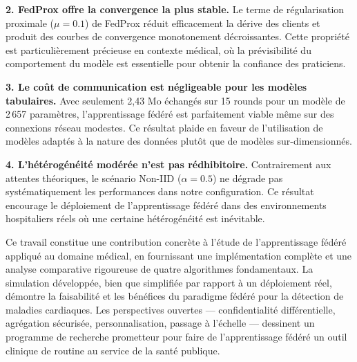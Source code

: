\documentclass[12pt,a4paper]{report}
\begin{document}
\textbf{2. FedProx offre la convergence la plus stable.} Le terme de r\'{e}gularisation proximale ($\mu = 0.1$) de FedProx r\'{e}duit efficacement la d\'{e}rive des clients et produit des courbes de convergence monotonement d\'{e}croissantes. Cette propri\'{e}t\'{e} est particuli\`{e}rement pr\'{e}cieuse en contexte m\'{e}dical, o\`{u} la pr\'{e}visibilit\'{e} du comportement du mod\`{e}le est essentielle pour obtenir la confiance des praticiens.

\textbf{3. Le co\^{u}t de communication est n\'{e}gligeable pour les mod\`{e}les tabulaires.} Avec seulement 2,43 Mo \'{e}chang\'{e}s sur 15 rounds pour un mod\`{e}le de 2\,657 param\`{e}tres, l'apprentissage f\'{e}d\'{e}r\'{e} est parfaitement viable m\^{e}me sur des connexions r\'{e}seau modestes. Ce r\'{e}sultat plaide en faveur de l'utilisation de mod\`{e}les adapt\'{e}s \`{a} la nature des donn\'{e}es plut\^{o}t que de mod\`{e}les sur-dimensionn\'{e}s.

\textbf{4. L'h\'{e}t\'{e}rog\'{e}n\'{e}it\'{e} mod\'{e}r\'{e}e n'est pas r\'{e}dhibitoire.} Contrairement aux attentes th\'{e}oriques, le sc\'{e}nario Non-IID ($\alpha = 0.5$) ne d\'{e}grade pas syst\'{e}matiquement les performances dans notre configuration. Ce r\'{e}sultat encourage le d\'{e}ploiement de l'apprentissage f\'{e}d\'{e}r\'{e} dans des environnements hospitaliers r\'{e}els o\`{u} une certaine h\'{e}t\'{e}rog\'{e}n\'{e}it\'{e} est in\'{e}vitable.

Ce travail constitue une contribution concr\`{e}te \`{a} l'\'{e}tude de l'apprentissage f\'{e}d\'{e}r\'{e} appliqu\'{e} au domaine m\'{e}dical, en fournissant une impl\'{e}mentation compl\`{e}te et une analyse comparative rigoureuse de quatre algorithmes fondamentaux. La simulation d\'{e}velopp\'{e}e, bien que simplifi\'{e}e par rapport \`{a} un d\'{e}ploiement r\'{e}el, d\'{e}montre la faisabilit\'{e} et les b\'{e}n\'{e}fices du paradigme f\'{e}d\'{e}r\'{e} pour la d\'{e}tection de maladies cardiaques. Les perspectives ouvertes --- confidentialit\'{e} diff\'{e}rentielle, agr\'{e}gation s\'{e}curis\'{e}e, personnalisation, passage \`{a} l'\'{e}chelle --- dessinent un programme de recherche prometteur pour faire de l'apprentissage f\'{e}d\'{e}r\'{e} un outil clinique de routine au service de la sant\'{e} publique.
\end{document}
